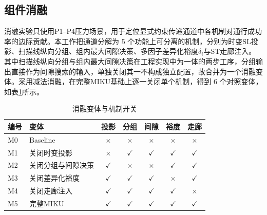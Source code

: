 \documentclass[a4paper,11pt]{ctexart}
\theoremstyle{definition}
\begin{document}
\subsection{组件消融}
\label{subsec:exp_ablation}

消融实验只使用P1--P4压力场景，用于定位显式约束传递通道中各机制对通行成功率的边际贡献。本工作把通道分解为 5 个功能上可分离的机制，分别为时变SL投影、扫描线纵向分组、组内最大间隙决策、多因子差异化裕度$\delta_i$与ST走廊注入。其中扫描线纵向分组与组内最大间隙决策在工程实现中为一体的两步工序，分组输出直接作为间隙搜索的输入，单独关闭其一不构成独立配置，故合并为一个消融变体。采用减法消融，在完整MIKU基础上逐一关闭单个机制，得到 6 个对照变体，如表\ref{tab:exp_ablation_matrix}所示。

\begin{table}[htbp]
\centering
\caption{消融变体与机制开关}
\label{tab:exp_ablation_matrix}
\small
\begin{tabular}{llccccc}
\toprule
\textbf{编号} & \textbf{变体} & 投影 & 分组 & 间隙 & 裕度 & 走廊 \\
\midrule
M0 & Baseline             & $\times$    & $\times$    & $\times$    & $\times$    & $\times$    \\
M1 & 关闭时变投影         & $\times$    & $\checkmark$ & $\checkmark$ & $\checkmark$ & $\checkmark$ \\
M2 & 关闭分组与间隙决策   & $\checkmark$ & $\times$    & $\times$    & $\checkmark$ & $\checkmark$ \\
M3 & 关闭差异化裕度       & $\checkmark$ & $\checkmark$ & $\checkmark$ & $\times$    & $\checkmark$ \\
M4 & 关闭走廊注入         & $\checkmark$ & $\checkmark$ & $\checkmark$ & $\checkmark$ & $\times$    \\
M5 & 完整MIKU             & $\checkmark$ & $\checkmark$ & $\checkmark$ & $\checkmark$ & $\checkmark$ \\
\bottomrule
\end{tabular}
\end{table}
\end{document}
